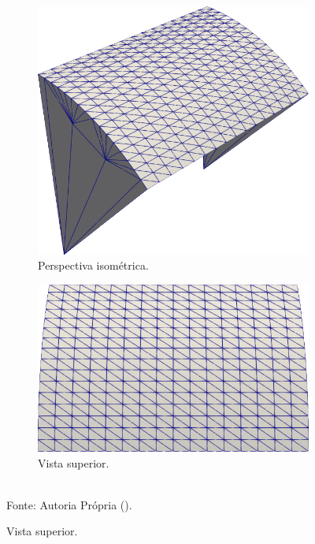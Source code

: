 \begin{figure}[h!]
    \centering
    \caption{Malha utilizada na simulação de \textit{Scordelis-Lo roof}.}
    \begin{subfigure}{0.35\textwidth}
        \includegraphics[width=\linewidth]{Figuras/scordelis/malha1.png}
        \caption{Perspectiva isométrica.}
    \end{subfigure}
    \begin{subfigure}{0.35\textwidth}
        \includegraphics[width=\linewidth]{Figuras/scordelis/malha2.png}
        \caption{Vista superior.}
    \end{subfigure}
    \\Fonte: Autoria Própria (\the\year).
    \label{fig:scordelis-mesh}
\end{figure}

